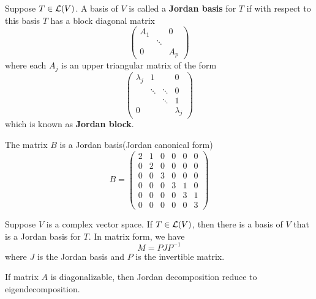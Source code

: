 \begin{refsection}
\begin{definition}
\cite[273]{axler2015linear}
Suppose $T\in \mathcal{L}(V)$. A basis of $V$ is called a \textbf{Jordan basis} for $T$ if with respect to this basis $T$ has a block diagonal matrix
$$\begin{pmatrix}
A_1 & ~ & 0\\
~ & \ddots & ~ \\
0 & ~ & A_p
\end{pmatrix}$$
where each $A_j$ is an upper triangular matrix of the form
$$
\begin{pmatrix}
\lambda_j & 1 & ~ & 0\\
~ & \ddots & \ddots & 0 \\
~ & ~ & \ddots & 1 \\
0 & ~ & ~ & \lambda_j
\end{pmatrix}$$
which is known as \textbf{Jordan block}.
\end{definition}

\begin{example}
	The matrix $B$ is a Jordan basis(Jordan canonical form)
	$$B=\begin{pmatrix}
	2 & 1 & 0 & 0 & 0 & 0\\ 
	0 & 2 & 0 & 0 & 0 & 0\\ 
	0 & 0 & 3 & 0 & 0 & 0\\ 
	0 & 0 & 0 & 3 & 1 & 0\\ 
	0 & 0 & 0 & 0 & 3 & 1\\ 
	0 & 0 & 0 & 0 & 0 & 3
	\end{pmatrix}$$
	
\end{example}

\begin{lemma}
\cite[273]{axler2015linear}Suppose $V$ is a complex vector space. If $T\in \mathcal{L}(V)$, then there is a basis of $V$ that is a Jordan basis for $T$. In matrix form, we have
$$M = PJP^{-1}$$
where $J$ is the Jordan basis and $P$ is the invertible matrix. 
\end{lemma}


\begin{remark}
If matrix $A$ is diagonalizable, then Jordan decomposition reduce to eigendecomposition.
\end{remark}

 


\end{refsection}
